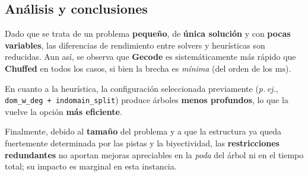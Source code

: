
\subsection{Análisis y conclusiones}\label{sec:04-acertijo-logico-analisis}
Dado que se trata de un problema \textbf{pequeño}, de \textbf{única solución} y con \textbf{pocas variables}, las diferencias de rendimiento entre solvers y heurísticas son reducidas. Aun así, se observa que \textbf{Gecode} es sistemáticamente más rápido que \textbf{Chuffed} en todos los casos, si bien la brecha es \emph{mínima} (del orden de los \(\mathrm{ms}\)).

En cuanto a la heurística, la configuración seleccionada previamente (\emph{p.\,ej.}, \texttt{dom\_w\_deg + indomain\_split}) produce árboles \textbf{menos profundos}, lo que la vuelve la opción \textbf{más eficiente}.

Finalmente, debido al \textbf{tamaño} del problema y a que la estructura ya queda fuertemente determinada por las pistas y la biyectividad, las \textbf{restricciones redundantes} no aportan mejoras apreciables en la \emph{poda} del árbol ni en el tiempo total; su impacto es marginal en esta instancia.
